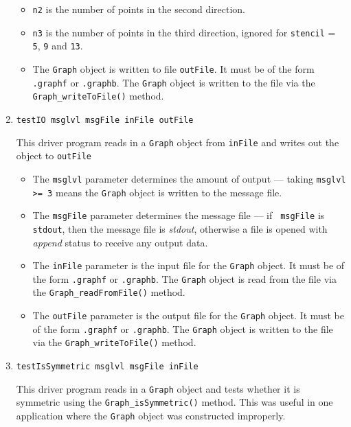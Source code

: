 \begin{enumerate}
\begin{itemize}
\item
{\tt n2} is the number of points in the second direction.
\item
{\tt n3} is the number of points in the third direction,
ignored for {\tt stencil} = {\tt 5}, {\tt 9} and {\tt 13}.
\item
The {\tt Graph} object is written to file {\tt outFile}.
It must be of the form {\tt *.graphf} or {\tt *.graphb}.
The {\tt Graph} object is written to the file via the
{\tt Graph\_writeToFile()} method.
\end{itemize}
\item
\begin{verbatim}
testIO msglvl msgFile inFile outFile
\end{verbatim}
This driver program reads in a {\tt Graph} object from {\tt inFile}
and writes out the object to {\tt outFile}
\par
\begin{itemize}
\item
The {\tt msglvl} parameter determines the amount of output ---
taking {\tt msglvl >= 3} means the {\tt Graph} object is written
to the message file.
\item
The {\tt msgFile} parameter determines the message file --- if {\tt
msgFile} is {\tt stdout}, then the message file is {\it stdout},
otherwise a file is opened with {\it append} status to receive any
output data.
\item
The {\tt inFile} parameter is the input file for the {\tt Graph}
object. It must be of the form {\tt *.graphf} or {\tt *.graphb}.
The {\tt Graph} object is read from the file via the
{\tt Graph\_readFromFile()} method.
\item
The {\tt outFile} parameter is the output file for the {\tt Graph}
object. It must be of the form {\tt *.graphf} or {\tt *.graphb}.
The {\tt Graph} object is written to the file via the
{\tt Graph\_writeToFile()} method.
\end{itemize}
\item
\begin{verbatim}
testIsSymmetric msglvl msgFile inFile 
\end{verbatim}
This driver program reads in a {\tt Graph} object and tests whether
it is symmetric using the {\tt Graph\_isSymmetric()} method.
This was useful in one application where the {\tt Graph} object was
constructed improperly.
\par

\end{enumerate}

